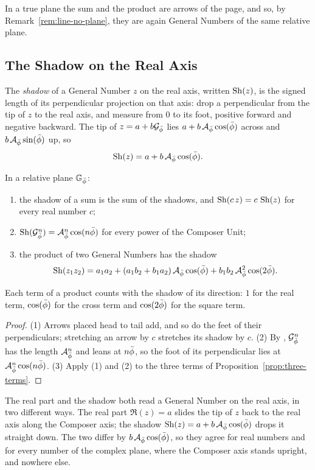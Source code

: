 In a true plane the sum and the product are arrows of the page, and so, by Remark~\ref{rem:line-no-plane}, they are again General Numbers of the same relative plane.

\subsection{The Shadow on the Real Axis}\label{subsec:gn-shadow}

\begin{definition}\label{def:shadow}
The \emph{shadow} of a General Number $z$ on the real axis, written $\operatorname{Sh}(z)$, is the signed length of its perpendicular projection on that axis: drop a perpendicular from the tip of $z$ to the real axis, and measure from $0$ to its foot, positive forward and negative backward. The tip of $z = a + b\mathcal{G}_{\bar{\phi}}$ lies $a + b\,\mathcal{A}_{\bar{\phi}}\cos(\bar{\phi})$ across and $b\,\mathcal{A}_{\bar{\phi}}\sin(\bar{\phi})$ up, so
\[
\operatorname{Sh}(z) = a + b\,\mathcal{A}_{\bar{\phi}}\cos(\bar{\phi}).
\]
\end{definition}

\begin{theorem}\label{thm:shadow-product}
In a relative plane $\mathbb{G}_{\bar{\phi}}$:
\begin{enumerate}
  \item the shadow of a sum is the sum of the shadows, and $\operatorname{Sh}(c\,z) = c\,\operatorname{Sh}(z)$ for every real number $c$;
  \item $\operatorname{Sh}(\mathcal{G}_{\bar{\phi}}^n) = \mathcal{A}_{\bar{\phi}}^n\cos(n\bar{\phi})$ for every power of the Composer Unit;
  \item the product of two General Numbers has the shadow
  \[
  \operatorname{Sh}(z_1 z_2) = a_1 a_2 + (a_1 b_2 + b_1 a_2)\,\mathcal{A}_{\bar{\phi}}\cos(\bar{\phi}) + b_1 b_2\,\mathcal{A}_{\bar{\phi}}^2\cos(2\bar{\phi}).
  \]
\end{enumerate}
Each term of a product counts with the shadow of its direction: $1$ for the real term, $\cos(\bar{\phi})$ for the cross term and $\cos(2\bar{\phi})$ for the square term.
\end{theorem}

\begin{proof}
(1) Arrows placed head to tail add, and so do the feet of their perpendiculars; stretching an arrow by $c$ stretches its shadow by $c$. (2) By , $\mathcal{G}_{\bar{\phi}}^n$ has the length $\mathcal{A}_{\bar{\phi}}^n$ and leans at $n\bar{\phi}$, so the foot of its perpendicular lies at $\mathcal{A}_{\bar{\phi}}^n\cos(n\bar{\phi})$. (3) Apply (1) and (2) to the three terms of Proposition~\ref{prop:three-terms}.
\end{proof}

\begin{remark}\label{rem:part-shadow}
The real part and the shadow both read a General Number on the real axis, in two different ways. The real part $\Re(z) = a$ slides the tip of $z$ back to the real axis along the Composer axis; the shadow $\operatorname{Sh}(z) = a + b\,\mathcal{A}_{\bar{\phi}}\cos(\bar{\phi})$ drops it straight down. The two differ by $b\,\mathcal{A}_{\bar{\phi}}\cos(\bar{\phi})$, so they agree for real numbers and for every number of the complex plane, where the Composer axis stands upright, and nowhere else.
\end{remark}

